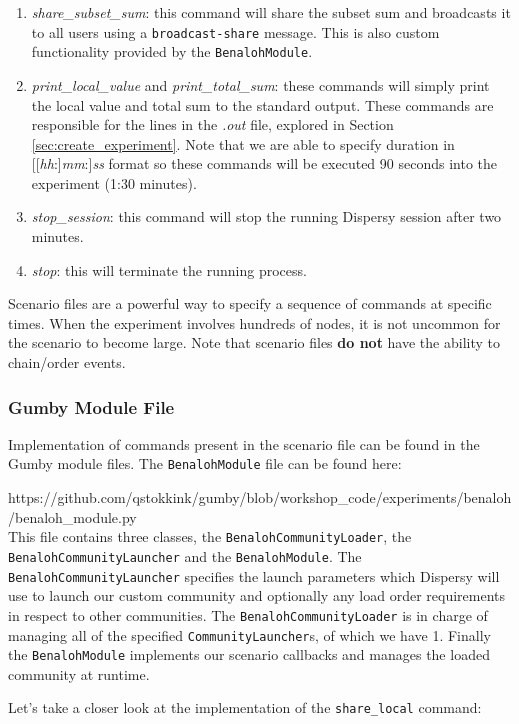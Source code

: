 \documentclass{article}
\begin{document}
\begin{enumerate}
	\item \emph{share\_subset\_sum}: this command will share the subset sum and broadcasts it to all users using a \texttt{broadcast-share} message. This is also custom functionality provided by the \texttt{BenalohModule}.
	\item \emph{print\_local\_value} and \emph{print\_total\_sum}: these commands will simply print the local value and total sum to the standard output. These commands are responsible for the lines in the \emph{.out} file, explored in Section \ref{sec:create_experiment}. Note that we are able to specify duration in [[\emph{hh}:]\emph{mm}:]\emph{ss} format so these commands will be executed 90 seconds into the experiment (1:30 minutes).
	\item \emph{stop\_session}: this command will stop the running Dispersy session after two minutes.
	\item \emph{stop}: this will terminate the running process.
\end{enumerate}

Scenario files are a powerful way to specify a sequence of commands at specific times.
When the experiment involves hundreds of nodes, it is not uncommon for the scenario to become large.
Note that scenario files \textbf{do not} have the ability to chain/order events.

\subsubsection{Gumby Module File}
Implementation of commands present in the scenario file can be found in the Gumby module files.
The \texttt{BenalohModule} file can be found here:

https://github.com/qstokkink/gumby/blob/workshop\_code/experiments/benaloh/benaloh\_module.py\\

This file contains three classes, the \texttt{BenalohCommunityLoader}, the \texttt{BenalohCommunityLauncher} and the \texttt{BenalohModule}.
The \texttt{BenalohCommunityLauncher} specifies the launch parameters which Dispersy will use to launch our custom community and optionally any load order requirements in respect to other communities.
The \texttt{BenalohCommunityLoader} is in charge of managing all of the specified \texttt{CommunityLauncher}s, of which we have 1.
Finally the \texttt{BenalohModule} implements our scenario callbacks and manages the loaded community at runtime.

Let's take a closer look at the implementation of the \texttt{share\_local} command:
\end{document}
